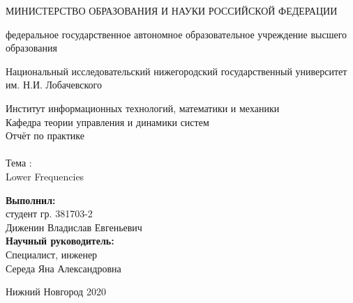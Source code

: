 \documentclass{article}
\begin{document}
    \begin{center} 
    \large МИНИСТЕРСТВО ОБРАЗОВАНИЯ И НАУКИ РОССИЙСКОЙ ФЕДЕРАЦИИ

федеральное государственное автономное образовательное учреждение высшего образования

Национальный исследовательский нижегородский государственный университет им. Н.И. Лобачевского

Институт информационных технологий, математики и механики \\
Кафедра теории управления и динамики систем \\[3.5cm] 
    
    \huge Отчёт по практике \\[0.6cm] %
    \\ 
    \huge{Тема :}\\[0.6cm]
    \huge Lower Frequencies\\[7.7cm]
    
    
    \end{center} 
    
    \begin{flushright}
    \large \textbf{Выполнил:} \\
    студент гр. 381703-2 \\
    Диженин Владислав Евгеньевич \\
    \textbf{Научный руководитель:} \\
    Специалист, инженер\\
    Середа Яна Александровна \\
    [3.7cm]
    \end{flushright}
    
    
    \begin{center} 
    \large Нижний Новгород 2020
    \end{center} 
    
    \thispagestyle{empty}
    \newpage
      \begin{center}
      \end{center}
        \tableofcontents
      
\end{document}
